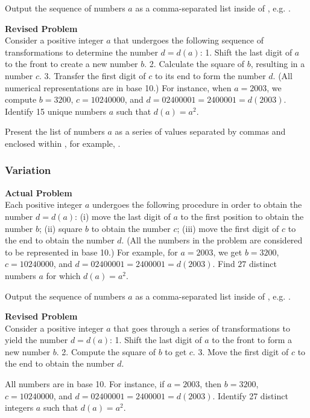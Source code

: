 Output the sequence of numbers $a$ as a comma-separated list inside of \boxed, e.g. .

\textbf{Revised Problem}\\
Consider a positive integer $a$ that undergoes the following sequence of transformations to determine the number $d = d(a)$:
1. Shift the last digit of $a$ to the front to create a new number $b$.
2. Calculate the square of $b$, resulting in a number $c$.
3. Transfer the first digit of $c$ to its end to form the number $d$.
(All numerical representations are in base 10.) 
For instance, when $a = 2003$, we compute $b = 3200$, $c = 10240000$, and $d = 02400001 = 2400001 = d(2003)$.
Identify 15 unique numbers $a$ such that $d(a) = a^2$.

Present the list of numbers $a$ as a series of values separated by commas and enclosed within \boxed, for example, .

\subsubsection{Variation}
\textbf{Actual Problem}\\
Each positive integer $a$ undergoes the following procedure in order to obtain the number $d = d(a)$:
(i) move the last digit of $a$ to the first position to obtain the number $b$;
(ii) square $b$ to obtain the number $c$;
(iii) move the first digit of $c$ to the end to obtain the number $d$.
(All the numbers in the problem are considered to be represented in base 10.) 
For example, for $a = 2003$, we get $b = 3200$, $c = 10240000$, and $d = 02400001 = 2400001 = d(2003)$.
Find $27$ distinct numbers $a$ for which $d(a) = a^2$.


Output the sequence of numbers $a$ as a comma-separated list inside of \boxed, e.g. .

\textbf{Revised Problem}\\
Consider a positive integer \( a \) that goes through a series of transformations to yield the number \( d = d(a) \):
1. Shift the last digit of \( a \) to the front to form a new number \( b \).
2. Compute the square of \( b \) to get \( c \).
3. Move the first digit of \( c \) to the end to obtain the number \( d \).

All numbers are in base 10. For instance, if \( a = 2003 \), then \( b = 3200 \), \( c = 10240000 \), and \( d = 02400001 = 2400001 = d(2003) \).
Identify 27 distinct integers \( a \) such that \( d(a) = a^2 \).

